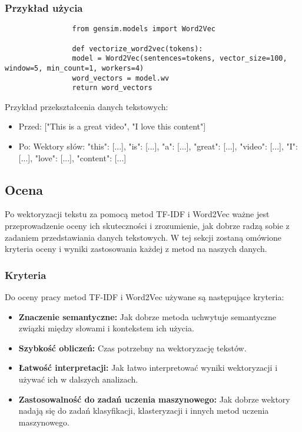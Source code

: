 	
 		\subsubsection{Przykład użycia}
 			\begin{verbatim}
				from gensim.models import Word2Vec
	
				def vectorize_word2vec(tokens):
				model = Word2Vec(sentences=tokens, vector_size=100, window=5, min_count=1, workers=4)
				word_vectors = model.wv
				return word_vectors
			\end{verbatim}

			Przykład przekształcenia danych tekstowych:

			\begin{itemize}
				\item Przed: ["This is a great video", "I love this content"]
				\item Po: Wektory słów: { "this": [...], "is": [...], "a": [...], "great": [...], "video": [...], "I": [...], "love": [...], "content": [...] }
			\end{itemize}
 	
 	\subsection{Ocena}
 		Po wektoryzacji tekstu za pomocą metod TF-IDF i Word2Vec ważne jest przeprowadzenie oceny ich skuteczności i zrozumienie, jak dobrze radzą sobie z zadaniem przedstawiania danych tekstowych. W tej sekcji zostaną omówione kryteria oceny i wyniki zastosowania każdej z metod na naszych danych.
 	
 		\subsubsection{Kryteria}
 			Do oceny pracy metod TF-IDF i Word2Vec używane są następujące kryteria:
 		
			\begin{itemize}
				\item \textbf{Znaczenie semantyczne:} Jak dobrze metoda uchwytuje semantyczne związki między słowami i kontekstem ich użycia.
				\item \textbf{Szybkość obliczeń:} Czas potrzebny na wektoryzację tekstów.
				\item \textbf{Łatwość interpretacji:} Jak łatwo interpretować wyniki wektoryzacji i używać ich w dalszych analizach.
				\item \textbf{Zastosowalność do zadań uczenia maszynowego:} Jak dobrze wektory nadają się do zadań klasyfikacji, klasteryzacji i innych metod uczenia maszynowego.
			\end{itemize}
		
